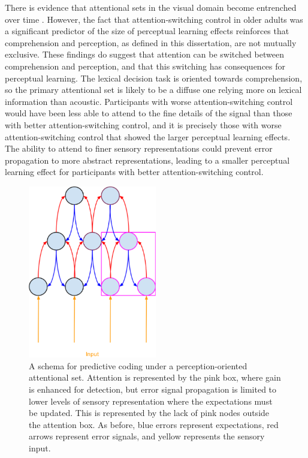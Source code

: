 There is evidence that attentional sets in the visual domain become entrenched over time \citep{Leber2006}.
However, the fact that attention-switching control in older adults was a significant predictor of the size of perceptual learning effects \citep{Scharenborg2014} reinforces that comprehension and perception, as defined in this dissertation, are not mutually exclusive.
These findings do suggest that attention can be switched between comprehension and perception, and that this switching has consequences for perceptual learning.
The lexical decision task is oriented towards comprehension, so the primary attentional set is likely to be a diffuse one relying more on lexical information than acoustic.
Participants with worse attention-switching control would have been less able to attend to the fine details of the signal than those with better attention-switching control, and it is precisely those with worse attention-switching control that showed the larger perceptual learning effects.
The ability to attend to finer sensory representations could prevent error propagation to more abstract representations, leading to a smaller perceptual learning effect for participants with better attention-switching control.

\begin{figure}[!ht]
\caption{A schema for predictive coding under a perception-oriented attentional set.  Attention is represented by the pink box, where gain is enhanced for detection, but error signal propagation is limited to lower levels of sensory representation where the expectations must be updated.  This is represented by the lack of pink nodes outside the attention box.  As before, blue errors represent expectations, red arrows represent error signals, and yellow represents the sensory input.}
\label{fig:predictivecodingperception}
\begin{center}
\includegraphics[width=0.5\textwidth]{pictures/perception_predictive_coding}
\end{center}
\end{figure}


